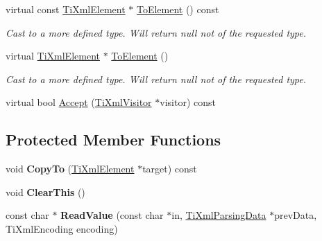 \begin{DoxyCompactItemize}
\item 
\hypertarget{class_ti_xml_element_ac5b8d0e25fa23fd9acbb6d146082901c}{virtual const \hyperlink{class_ti_xml_element}{\-Ti\-Xml\-Element} $\ast$ \hyperlink{class_ti_xml_element_ac5b8d0e25fa23fd9acbb6d146082901c}{\-To\-Element} () const }\label{class_ti_xml_element_ac5b8d0e25fa23fd9acbb6d146082901c}

\begin{DoxyCompactList}\small\item\em \-Cast to a more defined type. \-Will return null not of the requested type. \end{DoxyCompactList}\item 
\hypertarget{class_ti_xml_element_a9def86337ea7a755eb41cac980f60c7a}{virtual \hyperlink{class_ti_xml_element}{\-Ti\-Xml\-Element} $\ast$ \hyperlink{class_ti_xml_element_a9def86337ea7a755eb41cac980f60c7a}{\-To\-Element} ()}\label{class_ti_xml_element_a9def86337ea7a755eb41cac980f60c7a}

\begin{DoxyCompactList}\small\item\em \-Cast to a more defined type. \-Will return null not of the requested type. \end{DoxyCompactList}\item 
virtual bool \hyperlink{class_ti_xml_element_a31ab28cc3b892a69254391d6bbe08df3}{\-Accept} (\hyperlink{class_ti_xml_visitor}{\-Ti\-Xml\-Visitor} $\ast$visitor) const 
\end{DoxyCompactItemize}
\subsection*{\-Protected \-Member \-Functions}
\begin{DoxyCompactItemize}
\item 
\hypertarget{class_ti_xml_element_a9e0c1983b840de4134f1f6bf7af00b0f}{void {\bfseries \-Copy\-To} (\hyperlink{class_ti_xml_element}{\-Ti\-Xml\-Element} $\ast$target) const }\label{class_ti_xml_element_a9e0c1983b840de4134f1f6bf7af00b0f}

\item 
\hypertarget{class_ti_xml_element_a5670933ec2d7d9763b9891acc05d7f7d}{void {\bfseries \-Clear\-This} ()}\label{class_ti_xml_element_a5670933ec2d7d9763b9891acc05d7f7d}

\item 
\hypertarget{class_ti_xml_element_ac786bce103042d3837c4cc2ff6967d41}{const char $\ast$ {\bfseries \-Read\-Value} (const char $\ast$in, \hyperlink{class_ti_xml_parsing_data}{\-Ti\-Xml\-Parsing\-Data} $\ast$prev\-Data, \-Ti\-Xml\-Encoding encoding)}\label{class_ti_xml_element_ac786bce103042d3837c4cc2ff6967d41}

\end{DoxyCompactItemize}
